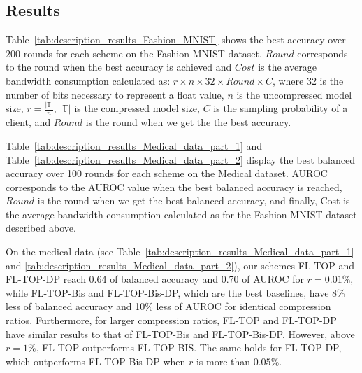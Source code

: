 \documentclass[accepted]{uai2021} %
\begin{document}


\subsection{Results}

Table~\ref{tab:description_results_Fashion_MNIST} shows the best accuracy over 200 rounds for each scheme on the Fashion-MNIST dataset. $\mathit{Round}$ corresponds to the round when the best accuracy is achieved and $\mathit{Cost}$ is the average bandwidth consumption calculated as: $r \times n \times 32 \times \mathit{Round} \times C$, where 32 is the number of bits necessary to represent a float value, $n$ is the uncompressed model size, $r=\frac{|\mathbb{T}|}{n}$, $|\mathbb{T}|$ is the compressed model size, $C$ is the sampling probability of a client, and $\mathit{Round}$ is the round when we get the the best accuracy.

Table~\ref{tab:description_results_Medical_data_part_1} and Table~\ref{tab:description_results_Medical_data_part_2} display the best balanced accuracy over 100 rounds for each scheme on the Medical dataset. AUROC corresponds to the AUROC value when the best balanced accuracy is reached, $\mathit{Round}$ is the round when we get the best balanced accuracy, and finally, Cost is the average bandwidth consumption calculated as for the Fashion-MNIST dataset described above.


On the medical data (see Table~\ref{tab:description_results_Medical_data_part_1} and \ref{tab:description_results_Medical_data_part_2}), our schemes FL-TOP and FL-TOP-DP reach 0.64 of balanced accuracy and 0.70 of AUROC for $r=0.01\%$, while FL-TOP-Bis and FL-TOP-Bis-DP, which are the best baselines, have 8\% less of balanced accuracy and 10\% less of AUROC for identical compression ratios. Furthermore, for larger compression ratios, FL-TOP and FL-TOP-DP have similar results to that of FL-TOP-Bis and FL-TOP-Bis-DP. However, above $r=1\%$, FL-TOP outperforms FL-TOP-BIS. The same holds for FL-TOP-DP, which outperforms FL-TOP-Bis-DP when $r$ is more than $0.05\%$.  
\end{document}
